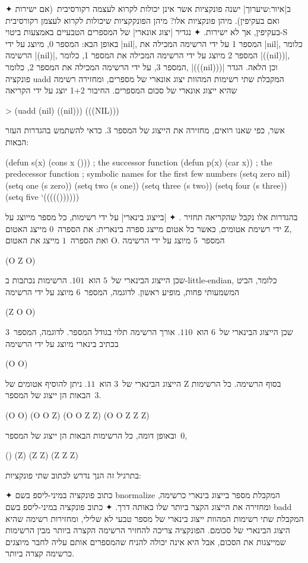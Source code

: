 \begin{enumerate}
  ✦ ב|איור:שיערוך| ישנה פונקציות אשר אינן יכולות לקרוא לעצמה
  רקורסיבית~(אם ישירות ואם בעקיפין). מיהן פונקציות אלו? מיהן
  הפונקקציות שיכולות לקרוא לעצמן רקורסיבית בעקיפין, אך לא ישירות.
  ✦ נגדיר
  \ע|יצוג אונארי| של המספרים הטבעיים באמצעות ביטוי-S באופן הבא: המספר
  0,
  מיוצג על ידי \E|nil|, המספר 1 על ידי הרשימה המכילה את \E|nil|, כלומר הרשימה
  \E|(nil)|, המספר 2 מיוצג על ידי הרשימה המכילה את המספר 1, כלומר \E|((nil))|,
  המספר 3, על ידי הרשימה המכילה את המספר 2, כלומר, \E|(((nil)))| וכן הלאה.
  הגדר פונקציה uadd המקבלת שתי רשימות המהוות יצוג אונארי של מספרים, ומחזירה
  רשימה שהיא ייצוג אונארי של סכום המספרים. החיבור 1+2 יוצג על ידי הקריאה
  \begin{LISP}
> (uadd (nil) ((nil)))
(((NIL)))
\end{LISP}
  אשר, כפי שאנו רואים, מחזירה את הייצוג של המספר 3.
  כדאי להשתמש בהגדרות העזר הבאות:
  \begin{LISP}
(defun s(x) (cons x ())) ; the successor function
(defun p(x) (car x)) ; the predecessor function
; symbolic names for the first few numbers
(setq zero nil)
(setq one (s zero))
(setq two (s one))
(setq three (s two))
(setq four (s three))
(setq five ‘((((())))))
\end{LISP}
  בהגדרות אלו נקבל שהקריאה
  תחזיר \lisp{((((()))))}.
  ✦ \ע|בייצוג בינארי| על ידי רשימות, כל מספר מייוצג על ידי רשימת אטומים, כאשר כל
  אטום מייצג ספרה בינארית: את הספרה~$0$ מייצג האטום Z, ואת הספרה~$1$ מייצג את
  האטום O. המספר~$5$ מיוצג על ידי הרשימה \begin{LISP}
(O Z O)
\end{LISP} שכן הייצוג הבינארי של~$5$ הוא~$101$. הרשימות נכתבות ב-little-endian,
  כלומר, הביט המשמעותי פחות, מופיע ראשון. לדוגמה, המספר~$6$ מיוצג על ידי הרשימה
  \begin{LISP}
 (Z O O)
 \end{LISP} שכן הייצוג הבינארי של~$6$ הוא~$110$. אורך הרשימה תלוי בגודל המספר.
  לדוגמה, המספר~$3$ בכתיב בינארי מיוצג על ידי הרשימה \begin{LISP}
 (O O)
 \end{LISP} הייצוג הבינארי של~$3$ הוא~$11$. ניתן להוסיף אטומים של Z בסוף
  הרשימה. כל הרשימות הבאות הן ייצוג של המספר~$3$. \begin{LISP}
(O O)
(O O Z)
(O O Z Z)
(O O Z Z Z)
\end{LISP}
  ובאופן דומה, כל הרשימות הבאות הן ייצוג של המספר~$0$,
  \begin{LISP}
()
(Z)
(Z Z)
(Z Z Z)
\end{LISP}
  בתרגיל זה הנך נדרש לכתוב שתי פונקציות:
  \begin{itemize}
    ✦ כתוב פונקציה במיני-ליספ בשם bnormalize המקבלת מספר בייצוג בינארי כרשימה,
    ומחזירה את הייצוג הקצר ביותר שלו באותה דרך.
    ✦ כתוב פונקציה במיני-ליספ בשם badd המקבלת שתי רשימות המהוות ייצוג בינארי
    של מספר טבעי לא שלילי, ומחזירות רשימה שהיא היצוג הבינארי של סכומם.
    הפונקציה צריכה להחזיר הרשימה הקצרה ביותר מבין הרשימות שמייצגות את הסכום,
    אבל היא אינה יכולה להניח שהמספרים אותם עליה לחבר מיוצגים כרשימה קצרה
    ביותר.
  \end{itemize}
\end{enumerate}
